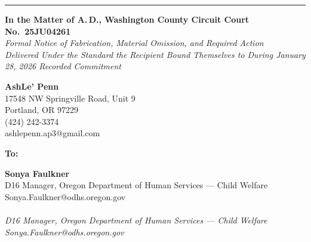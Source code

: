 \documentclass[10pt,a4paper,roman]{moderncv}
\newcommand{\recip}[2]{\textbf{#1}\ifx\\#2\\\else\\[1pt]{\scriptsize\itshape #2}\fi\par\medskip}
\begin{document}
	
	{\color{inkblue}\noindent\rule{\textwidth}{1.3pt}}
	\vspace{0.35em}
	
	\begin{center}
		{\color{inkblue}\textbf{In the Matter of A.\,D., Washington County Circuit Court No.~25JU04261}}\\
		\small \textit{Formal Notice of Fabrication, Material Omission, and Required Action}\\
		\small \textit{Delivered Under the Standard the Recipient Bound Themselves to During January 28, 2026 Recorded Commitment}
	\end{center}
	
	\begin{flushright}
		\textbf{AshLe' Penn}\\
		\scriptsize{17548 NW Springville Road, Unit 9}\\
		\scriptsize{Portland, OR 97229}\\
		\scriptsize{\faPhone\enspace (424) 242-3374}\\
		\scriptsize{\faEnvelope\enspace ashlepenn.ap3@gmail.com}
	\end{flushright}
	
	\vspace{0.8em}
	
	\noindent\textbf{To:}\par\smallskip
	{\raggedright\recip{Sonya Faulkner}{D16 Manager, Oregon Department of Human Services --- Child Welfare\\ Sonya.Faulkner@odhs.oregon.gov}}
	
\end{document}
